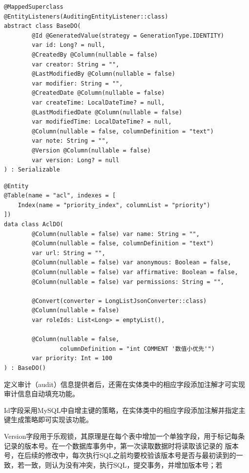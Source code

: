 \documentclass[titlepage,UTF8,linespread=1.5]{ctexart}
\begin{document}
\begin{mdframed}\begin{verbatim}
@MappedSuperclass
@EntityListeners(AuditingEntityListener::class)
abstract class BaseDO(
        @Id @GeneratedValue(strategy = GenerationType.IDENTITY) 
        var id: Long? = null,
        @CreatedBy @Column(nullable = false) 
        var creator: String = "",
        @LastModifiedBy @Column(nullable = false) 
        var modifier: String = "",
        @CreatedDate @Column(nullable = false) 
        var createTime: LocalDateTime? = null,
        @LastModifiedDate @Column(nullable = false) 
        var modifiedTime: LocalDateTime? = null,
        @Column(nullable = false, columnDefinition = "text") 
        var note: String = "",
        @Version @Column(nullable = false) 
        var version: Long? = null
) : Serializable
\end{verbatim}\end{mdframed}\par
\begin{mdframed}\begin{verbatim}
@Entity
@Table(name = "acl", indexes = [
    Index(name = "priority_index", columnList = "priority")
])
data class AclDO(
        @Column(nullable = false) var name: String = "",
        @Column(nullable = false, columnDefinition = "text") 
        var url: String = "",
        @Column(nullable = false) var anonymous: Boolean = false,
        @Column(nullable = false) var affirmative: Boolean = false,
        @Column(nullable = false) var permissions: String = "",

        @Convert(converter = LongListJsonConverter::class) 
        @Column(nullable = false)
        var roleIds: List<Long> = emptyList(),

        @Column(nullable = false, 
                columnDefinition = "int COMMENT '数值小优先'") 
        var priority: Int = 100
) : BaseDO()
\end{verbatim}\end{mdframed}\par
定义审计（audit）信息提供者后，还需在实体类中的相应字段添加注解才可实现审计信息自动填充功能。\par
Id字段采用MySQL中自增主键的策略，在实体类中的相应字段添加注解并指定主键生成策略即可实现该功能。\par
Version字段用于乐观锁，其原理是在每个表中增加一个单独字段，用于标记每条记录的版本号。在一个数据库事务中，第一次读取数据时将读取该记录的
版本号，在后续的修改中，每次执行SQL之前均要校验该版本号是否与最初读到的一致，若一致，则认为没有冲突，执行SQL，提交事务，并增加版本号；若
\end{document}
